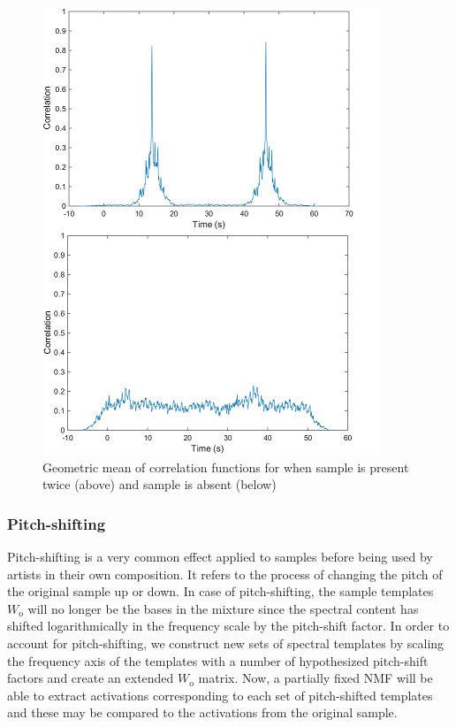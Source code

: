 \documentclass{article}
\begin{document}
\begin{figure}[h!]
\centering
\includegraphics[width=\linewidth]{corr.png}
\caption{Geometric mean of correlation functions for when sample is present twice (above) and sample is absent (below)}
\label{fig1}
\end{figure}

\subsubsection{Pitch-shifting}

Pitch-shifting is a very common effect applied to samples before being used by artists in their own composition. It refers to the process of changing the pitch of the original sample up or down. In case of pitch-shifting, the sample templates $W_\mathrm{o}$ will no longer be the bases in the mixture since the spectral content has shifted logarithmically in the frequency scale by the pitch-shift factor. In order to account for pitch-shifting, we construct new sets of spectral templates by scaling the frequency axis of the templates with a number of hypothesized pitch-shift factors and create an extended $W_\mathrm{o}$ matrix. Now, a partially fixed NMF will be able to extract activations corresponding to each set of pitch-shifted templates and these may be compared to the activations from the original sample.
\end{document}
